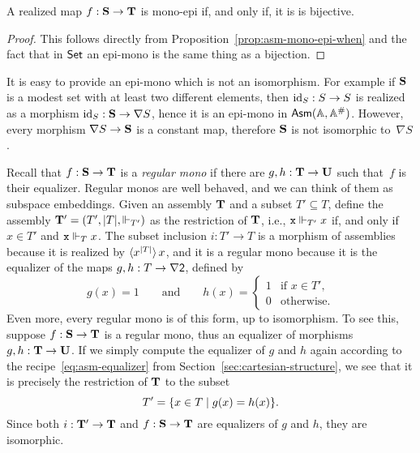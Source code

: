 \begin{corollary}
  A realized map $f : \mathbf{S} \to \mathbf{T}$ is mono-epi if, and only
  if, it is is bijective.
\end{corollary}

\begin{proof}
  This follows directly from Proposition~\ref{prop:asm-mono-epi-when}
  and the fact that in $\mathsf{Set}$ an epi-mono is the same thing as a
  bijection.
\end{proof}

It is easy to provide an epi-mono which is not an isomorphism. For
example if $\mathbf{S}$ is a modest set with at least two different
elements, then $\mathrm{id}_S : S \to S$ is realized as a morphism $\mathrm{id}_S :
\mathbf{S} \to \nabla S$, hence it is an epi-mono in $\mathsf{Asm}(\mathbb{A},\mathbb{A}^{\#})$. However,
every morphism $\nabla S \to \mathbf{S}$ is a constant map, therefore
$\mathbf{S}$ is not isomorphic to~$\nabla{S}$.

Recall that $f : \mathbf{S} \to \mathbf{T}$ is a \emph{regular mono} if
there are $g, h : \mathbf{T} \to \mathbf{U}$ such that~$f$ is their
equalizer. Regular monos are well behaved, and we can think of them as
subspace embeddings. Given an assembly $\mathbf{T}$ and a subset $T'
\subseteq T$, define the assembly $\mathbf{T}' = (T', |T|, {\Vdash_{T'}})$
as the restriction of $\mathbf{T}$, i.e., $\mathtt{x} \Vdash_{T'} x$ if, and only
if $x \in T'$ and $\mathtt{x} \Vdash_T x$. The subset inclusion $i : T' \to T$
is a morphism of assemblies because it is realized by
$\langle x^{|T|} \rangle\,x$, and it is a regular mono because it is
the equalizer of the maps $g, h : T \to \nabla \mathsf{2}$, defined by
%
\begin{equation*}
  g(x) = 1
  \qquad\text{and}\qquad
  h(x) =
  \begin{cases}
    1 & \text{if $x \in T'$,}\\
    0 & \text{otherwise}.
  \end{cases}
\end{equation*}
%
Even more, every regular mono is of this form, up to isomorphism. To
see this, suppose $f : \mathbf{S} \to \mathbf{T}$ is a regular mono, thus an
equalizer of morphisms $g, h : \mathbf{T} \to \mathbf{U}$. If we simply
compute the equalizer of $g$ and $h$ again according to the
recipe~\eqref{eq:asm-equalizer} from
Section~\ref{sec:cartesian-structure}, we see that it is precisely the
restriction of $\mathbf{T}$ to the subset
% 
\begin{equation*}
  T' = \{x \in T \mid g(x) = h(x)\}.
\end{equation*}
% 
Since both $i : \mathbf{T}' \to \mathbf{T}$ and $f : \mathbf{S} \to \mathbf{T}$
are equalizers of $g$ and $h$, they are isomorphic.

